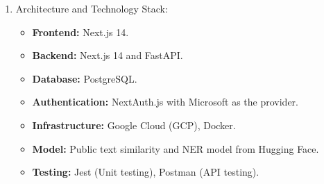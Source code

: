 \begin{enumerate}
\begin{itemize}
    \end{itemize}
    \item Architecture and Technology Stack:
    \begin{itemize}
        \item \textbf{Frontend:} Next.js 14.
        \item \textbf{Backend:} Next.js 14 and FastAPI.
        \item \textbf{Database:} PostgreSQL.
        \item \textbf{Authentication:} NextAuth.js with Microsoft as the provider.
        \item \textbf{Infrastructure:} Google Cloud (GCP), Docker.
        \item \textbf{Model:} Public text similarity and NER model from Hugging Face.
        \item \textbf{Testing:} Jest (Unit testing), Postman (API testing).
    \end{itemize}
\end{enumerate}


